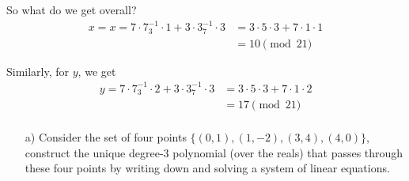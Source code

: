 \documentclass[]{article}
\begin{document}
\begin{qunlist}
{{\begin{enumerate}
So what do we get overall?
\begin{align*}
x = x = 7 \cdot 7^{-1}_3 \cdot 1 + 3 \cdot 3^{-1}_7 \cdot 3 &= 3 \cdot 5 \cdot 3 + 7 \cdot 1 \cdot 1 \\
&= 10 \pmod {21}
\end{align*}

Similarly, for $y$, we get
\begin{align*}
y = 7 \cdot 7^{-1}_3 \cdot 2 + 3 \cdot 3^{-1}_7 \cdot 3 &= 3 \cdot 5 \cdot 3 + 7 \cdot 1 \cdot 2 \\
&= 17 \pmod{21} \\
\end{align*}

  \end{enumerate}
}}\fi




\begin{itemize}
\qpart
\item[a)] Consider the set of four points $\{(0,1), (1,-2), (3,4), (4,0)\}$, construct the unique degree-$3$ polynomial (over the reals) that passes through these four points by writing down and solving a system of linear equations.



\end{itemize}
\end{qunlist}
\end{document}
